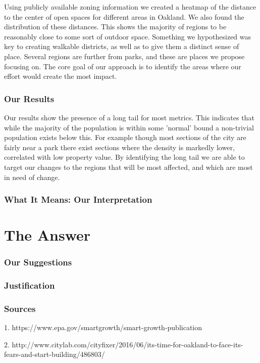 \documentclass[]{report}
\begin{document}
	Using publicly available zoning information we created a heatmap of the distance to the center of open spaces for different areas in Oakland. We also found the distribution of these distances. This shows the majority of regions to be reasonably close to some sort of outdoor space. Something we hypothesized was key to creating walkable districts, as well as to give them a distinct sense of place. Several regions are further from parks, and these are places we propose focusing on. The core goal of our approach is to identify the areas where our effort would create the most impact. 
	
	\section{Our Results}
	Our results show the presence of a long tail for most metrics. This indicates that while the majority of the population is within some 'normal' bound a non-trivial population exists below this. For example though most sections of the city are fairly near a park there exist sections where the density is markedly lower, correlated with low property value. By identifying the long tail we are able to target our changes to the regions that will be most affected, and which are most in need of change. 
	
	\section{What It Means: Our Interpretation}
	
\part{The Answer}
	\section{Our Suggestions}
	\section{Justification}
	
	\section{Sources}
	
	1. https://www.epa.gov/smartgrowth/smart-growth-publication 
	
	2. http://www.citylab.com/cityfixer/2016/06/its-time-for-oakland-to-face-its-fears-and-start-building/486803/ 
	
\end{document}
